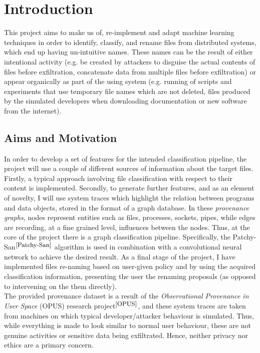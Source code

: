 

\chapter{Introduction}

This project aims to make us of, re-implement and adapt machine learning techniques in order to identify, classify, and rename files from distributed systems, which end up having un-intuitive names. These names can be the result of either intentional activity (e.g. be created by attackers to disguise the actual contents of files before exfiltration, concatenate data from multiple files before exfiltration) or appear organically as part of the using system (e.g. running of scripts and experiments that use temporary file names which are not deleted, files produced by the simulated developers when downloading documentation or new software from the internet). \\


\section{Aims and Motivation}  \label{1.1}

In order to develop a set of features for the intended classification pipeline, the project will use a couple of different sources of information about the target files. Firstly, a typical approach involving file classification with respect to their content is implemented. Secondly, to generate further features, and as an element of novelty, I will use system traces which highlight the relation between programs and data objects, stored in the format of a graph database. In these \textit{provenance graphs}, nodes represent entities such as files, processes, sockets, pipes, while edges are recording, at a fine grained level, influences between the nodes. Thus, at the core of the project there is a graph classification pipeline. Specifically, the Patchy-San$^{\small \cite{Patchy-San}}$ algorithm is used in combination with a convolutional neural network to achieve the desired result. As a final stage of the project, I have implemented files re-naming based on user-given policy and by using the acquired classification information, presenting the user the renaming proposals (as opposed to intervening on the them directly). \\

The provided provenance dataset is a result of the \textit{Observational Provenance in User Space} (OPUS) research project$^{\small \cite{OPUS}}$, and these system traces are taken from machines on which typical developer/attacker behaviour is simulated. Thus, while everything is made to look similar to normal user behaviour, these are not genuine activities or sensitive data being exfiltrated. Hence, neither privacy nor ethics are a primary concern. \\

